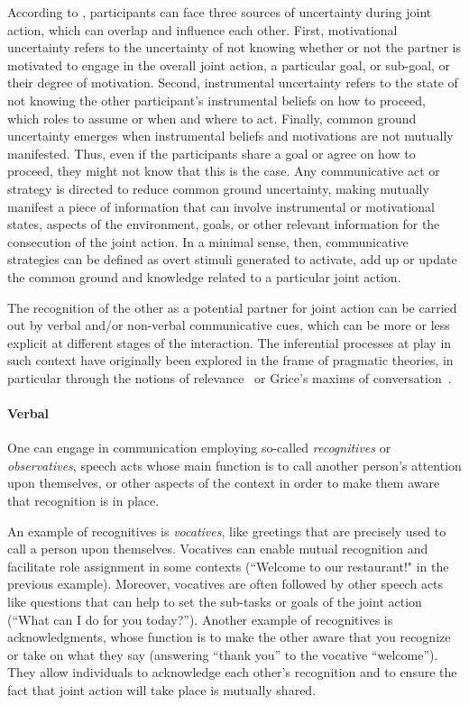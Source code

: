 \documentclass[a4paper,11pt,twoside]{StyleThese}
\begin{document}
According to \cite{michael_2015_commitments}, participants can face three sources of uncertainty during joint action, which can overlap and influence each other. First, motivational uncertainty refers to the uncertainty of not knowing whether or not the partner is motivated to engage in the overall joint action, a particular goal, or sub-goal, or their degree of motivation. Second, instrumental uncertainty refers to the state of not knowing the other participant’s instrumental beliefs on how to proceed, \ie which roles to assume or when and where to act. Finally, common ground uncertainty emerges when instrumental beliefs and motivations are not mutually manifested. Thus, even if the participants share a goal or agree on how to proceed, they might not know that this is the case. Any communicative act or strategy is directed to reduce common ground uncertainty, making mutually manifest a piece of information that can involve instrumental or motivational states, aspects of the environment, goals, or other relevant information for the consecution of the joint action. In a minimal sense, then, communicative strategies can be defined as overt stimuli generated to activate, add up or update the common ground and knowledge related to a particular joint action. 

The recognition of the other as a potential partner for joint action can be carried out by verbal and/or non-verbal communicative cues, which can be more or less explicit at different stages of the interaction. The inferential processes at play in such context have originally been explored in the frame of pragmatic theories, in particular through the notions of relevance~\citep{sperber_1995_relevance} or Grice’s maxims of conversation~\citep{grice_1989_studies}.

\paragraph{Verbal} One can engage in communication employing so-called \emph{recognitives} or \emph{observatives}, speech acts whose main function is to call another person’s attention upon themselves, or other aspects of the context in order to make them aware that recognition is in place. 

An example of recognitives is \emph{vocatives}, like greetings that are precisely used to call a person upon themselves. Vocatives can enable mutual recognition and facilitate role assignment in some contexts (\eg ``Welcome to our restaurant!" in the previous example). Moreover, vocatives are often followed by other speech acts like questions that can help to set the sub-tasks or goals of the joint action (\eg ``What can I do for you today?''). Another example of recognitives is acknowledgments, whose function is to make the other aware that you recognize or take on what they say (\eg answering ``thank you'' to the vocative ``welcome''). They allow individuals to acknowledge each other's recognition and to ensure the fact that joint action will take place is mutually shared. 
\end{document}
